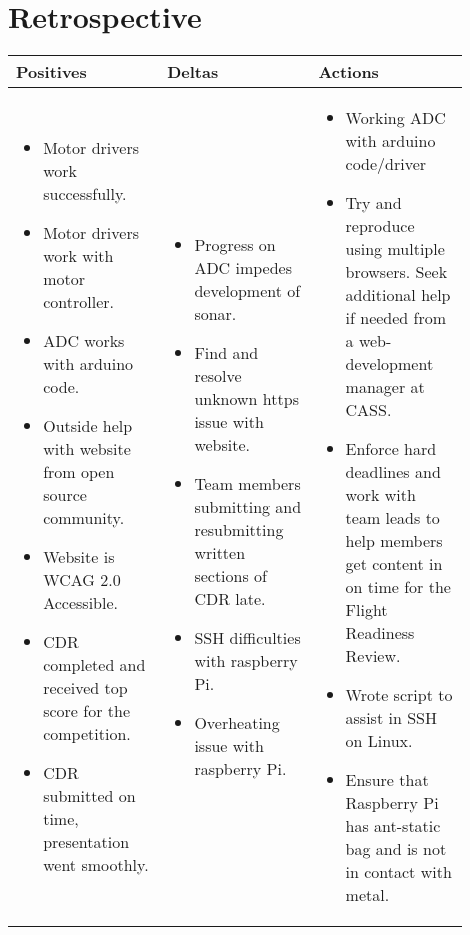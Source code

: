 \documentclass[onecolumn, draftclsnofoot,10pt, compsoc]{IEEEtran}
\newenvironment{myitemize}
{ \begin{itemize}
    \setlength{\itemsep}{0pt}
    \setlength{\parskip}{0pt}
    \setlength{\parsep}{0pt}     }
{ \end{itemize}                  }
\begin{document}
\section{Retrospective}
\begin{singlespacing}
\begin{tabular} {p{0.3\linewidth} p{0.3\linewidth} p{0.3\linewidth}} \textbf{Positives} & \textbf{Deltas} & \textbf{Actions}\\\hline
\vspace{-\baselineskip}\begin{myitemize}
\item Motor drivers work successfully.
\item Motor drivers work with motor controller.
\item ADC works with arduino code.
\item Outside help with website from open source community.
\item Website is WCAG 2.0 Accessible.
\item CDR completed and received top score for the competition.
\item CDR submitted on time, presentation went smoothly.
\vspace{-\baselineskip}\end{myitemize} & 
\vspace{-\baselineskip}\begin{myitemize}
\item Progress on ADC impedes development of sonar.
\item Find and resolve unknown https issue with website.
\item Team members submitting and resubmitting written sections of CDR late.
\item SSH difficulties with raspberry Pi.
\item Overheating issue with raspberry Pi.
\vspace{-\baselineskip}\end{myitemize} & 
\vspace{-\baselineskip}\begin{myitemize}
\item Working ADC with arduino code/driver
\item Try and reproduce using multiple browsers. Seek additional help if needed from a web-development manager at CASS.
\item Enforce hard deadlines and work with team leads to help members get content in on time for the Flight Readiness Review.
\item Wrote script to assist in SSH on Linux.
\item Ensure that Raspberry Pi has ant-static bag and is not in contact with metal.
\vspace{-\baselineskip}\end{myitemize}
\end{tabular}
\end{singlespacing}
\end{document}
